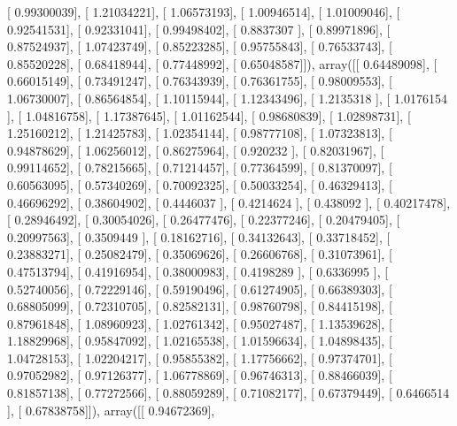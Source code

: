 \documentclass{article}
\begin{document}
       [ 0.99300039],
       [ 1.21034221],
       [ 1.06573193],
       [ 1.00946514],
       [ 1.01009046],
       [ 0.92541531],
       [ 0.92331041],
       [ 0.99498402],
       [ 0.8837307 ],
       [ 0.89971896],
       [ 0.87524937],
       [ 1.07423749],
       [ 0.85223285],
       [ 0.95755843],
       [ 0.76533743],
       [ 0.85520228],
       [ 0.68418944],
       [ 0.77448992],
       [ 0.65048587]]), array([[ 0.64489098],
       [ 0.66015149],
       [ 0.73491247],
       [ 0.76343939],
       [ 0.76361755],
       [ 0.98009553],
       [ 1.06730007],
       [ 0.86564854],
       [ 1.10115944],
       [ 1.12343496],
       [ 1.2135318 ],
       [ 1.0176154 ],
       [ 1.04816758],
       [ 1.17387645],
       [ 1.01162544],
       [ 0.98680839],
       [ 1.02898731],
       [ 1.25160212],
       [ 1.21425783],
       [ 1.02354144],
       [ 0.98777108],
       [ 1.07323813],
       [ 0.94878629],
       [ 1.06256012],
       [ 0.86275964],
       [ 0.920232  ],
       [ 0.82031967],
       [ 0.99114652],
       [ 0.78215665],
       [ 0.71214457],
       [ 0.77364599],
       [ 0.81370097],
       [ 0.60563095],
       [ 0.57340269],
       [ 0.70092325],
       [ 0.50033254],
       [ 0.46329413],
       [ 0.46696292],
       [ 0.38604902],
       [ 0.4446037 ],
       [ 0.4214624 ],
       [ 0.438092  ],
       [ 0.40217478],
       [ 0.28946492],
       [ 0.30054026],
       [ 0.26477476],
       [ 0.22377246],
       [ 0.20479405],
       [ 0.20997563],
       [ 0.3509449 ],
       [ 0.18162716],
       [ 0.34132643],
       [ 0.33718452],
       [ 0.23883271],
       [ 0.25082479],
       [ 0.35069626],
       [ 0.26606768],
       [ 0.31073961],
       [ 0.47513794],
       [ 0.41916954],
       [ 0.38000983],
       [ 0.4198289 ],
       [ 0.6336995 ],
       [ 0.52740056],
       [ 0.72229146],
       [ 0.59190496],
       [ 0.61274905],
       [ 0.66389303],
       [ 0.68805099],
       [ 0.72310705],
       [ 0.82582131],
       [ 0.98760798],
       [ 0.84415198],
       [ 0.87961848],
       [ 1.08960923],
       [ 1.02761342],
       [ 0.95027487],
       [ 1.13539628],
       [ 1.18829968],
       [ 0.95847092],
       [ 1.02165538],
       [ 1.01596634],
       [ 1.04898435],
       [ 1.04728153],
       [ 1.02204217],
       [ 0.95855382],
       [ 1.17756662],
       [ 0.97374701],
       [ 0.97052982],
       [ 0.97126377],
       [ 1.06778869],
       [ 0.96746313],
       [ 0.88466039],
       [ 0.81857138],
       [ 0.77272566],
       [ 0.88059289],
       [ 0.71082177],
       [ 0.67379449],
       [ 0.6466514 ],
       [ 0.67838758]]), array([[ 0.94672369],
\end{document}
